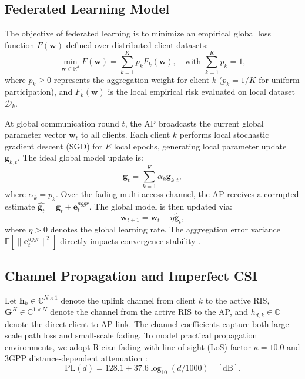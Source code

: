 \documentclass[journal,twocolumn]{IEEEtran}
\begin{document}
\subsection{Federated Learning Model}
The objective of federated learning is to minimize an empirical global loss function $F(\mathbf{w})$ defined over distributed client datasets:
\begin{equation}
    \min_{\mathbf{w} \in \mathbb{R}^d} F(\mathbf{w}) = \sum_{k=1}^K p_k F_k(\mathbf{w}), \quad \text{with } \sum_{k=1}^K p_k = 1,
    \label{eq:fl_global_obj}
\end{equation}
where $p_k \ge 0$ represents the aggregation weight for client $k$ ($p_k = 1/K$ for uniform participation), and $F_k(\mathbf{w})$ is the local empirical risk evaluated on local dataset $\mathcal{D}_k$.

At global communication round $t$, the AP broadcasts the current global parameter vector $\mathbf{w}_t$ to all clients. Each client $k$ performs local stochastic gradient descent (SGD) for $E$ local epochs, generating local parameter update $\mathbf{g}_{k,t}$. The ideal global model update is:
\begin{equation}
    \mathbf{g}_t = \sum_{k=1}^K \alpha_k \mathbf{g}_{k,t},
    \label{eq:ideal_aggr}
\end{equation}
where $\alpha_k = p_k$. Over the fading multi-access channel, the AP receives a corrupted estimate $\hat{\mathbf{g}_t} = \mathbf{g}_t + \mathbf{e}_t^{aggr}$. The global model is then updated via:
\begin{equation}
    \mathbf{w}_{t+1} = \mathbf{w}_t - \eta \hat{\mathbf{g}}_t,
    \label{eq:model_update}
\end{equation}
where $\eta > 0$ denotes the global learning rate. The aggregation error variance $\mathbb{E}[\|\mathbf{e}_t^{aggr}\|^2]$ directly impacts convergence stability \cite{xiaowen_cao_d1a16fb1, kwang_in_kim_3de81c66}.

\subsection{Channel Propagation and Imperfect CSI}
Let $\mathbf{h}_k \in \mathbb{C}^{N \times 1}$ denote the uplink channel from client $k$ to the active RIS, $\mathbf{G}^H \in \mathbb{C}^{1 \times N}$ denote the channel from the active RIS to the AP, and $h_{d,k} \in \mathbb{C}$ denote the direct client-to-AP link. The channel coefficients capture both large-scale path loss and small-scale fading. To model practical propagation environments, we adopt Rician fading with line-of-sight (LoS) factor $\kappa = 10.0$ and 3GPP distance-dependent attenuation \cite{wanli_ni_d7a6fb6d}:
\begin{equation}
    \text{PL}(d) = 128.1 + 37.6 \log_{10}(d / 1000) \quad [\text{dB}].
\end{equation}
\end{document}
